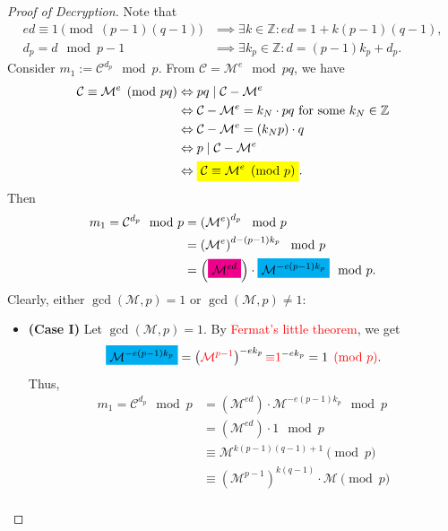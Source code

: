 \documentclass{article}
\newcommand{\mathcolorbox}[2]{\colorbox{#1}{$\displaystyle #2$}}
\theoremstyle{definition}
\newcommand{\Z}{\mathbb{Z}}
\newcommand{\of}[1]{\left( #1 \right)}
\begin{document}
	\begin{proof}[Proof of Decryption]
		Note that \begin{align*}
		ed\equiv 1\pmod{(p-1)(q-1)}&\implies\exists k\in\Z:ed=1+k(p-1)(q-1),\\
		d_p=d\mod p-1&\implies\exists k_p\in\Z: d=(p-1)k_p+d_p.
		\end{align*}
		Consider $m_1:=\mathcal{C}^{d_p}\mod p$. From $\mathcal{C}=\mathcal{M}^e\mod pq$, we have \begin{align*}
		\mathcal{C}\equiv\mathcal{M}^e\pmod{pq} &\Leftrightarrow pq\mid \mathcal{C}-\mathcal{M}^e\\
		&\Leftrightarrow \mathcal{C}-\mathcal{M}^e=k_{N}\cdot pq\ \text{for some $k_{N}\in\Z$}\\
		&\Leftrightarrow \mathcal{C}-\mathcal{M}^e=\of{k_{N}p}\cdot q\\
		&\Leftrightarrow {p\mid \mathcal{C}-\mathcal{M}^e}\\
		&\Leftrightarrow \mathcolorbox{-blue}{\mathcal{C}\equiv\mathcal{M}^e\pmod{p}}.
		\end{align*} Then \begin{align*}
		m_1=\mathcal{C}^{d_p}\mod p
		&=\of{\mathcal{M}^e}^{d_p}\mod p\\
		&=\of{\mathcal{M}^e}^{d-(p-1)k_p}\mod p\\
		&=\of{\mathcolorbox{magenta}{\mathcal{M}^{ed}}}\cdot\mathcolorbox{cyan}{\mathcal{M}^{-e(p-1)k_p}}\mod p.
		\end{align*} Clearly, either $\gcd\of{\mathcal{M},p}=1$ or
		$\gcd\of{\mathcal{M},p}\neq 1$:
		\begin{itemize}
			\item[] \begin{tcolorbox}[colback=white,colframe=black,arc=5pt,title={\color{white}\bf }]
				\textbf{(Case I)} Let $\gcd\of{\mathcal{M},p}=1$. By \textcolor{red}{Fermat's little theorem}, we get \[
				\mathcolorbox{cyan}{\mathcal{M}^{-e(p-1)k_p}}=\of{\textcolor{red}{\mathcal{M}^{p-1}}}^{-ek_p}\textcolor{red}{\equiv} \textcolor{red}{1}^{-ek_p}=1\textcolor{red}{\pmod{p}}.
				\] Thus, \begin{align*}
				m_1=\mathcal{C}^{d_p}\mod p&=\of{{\mathcal{M}^{ed}}}\cdot{\mathcal{M}^{-e(p-1)k_p}}\mod p\\&=\of{{\mathcal{M}^{ed}}}\cdot 1\mod p\\
				&\equiv\mathcal{M}^{k(p-1)(q-1)+1}\pmod{p}\\
				&\equiv\of{\mathcal{M}^{p-1}}^{k(q-1)}\cdot\mathcal{M}\pmod{p}\\

\end{align*}
\end{tcolorbox}
\end{itemize}
\end{proof}
\end{document}
